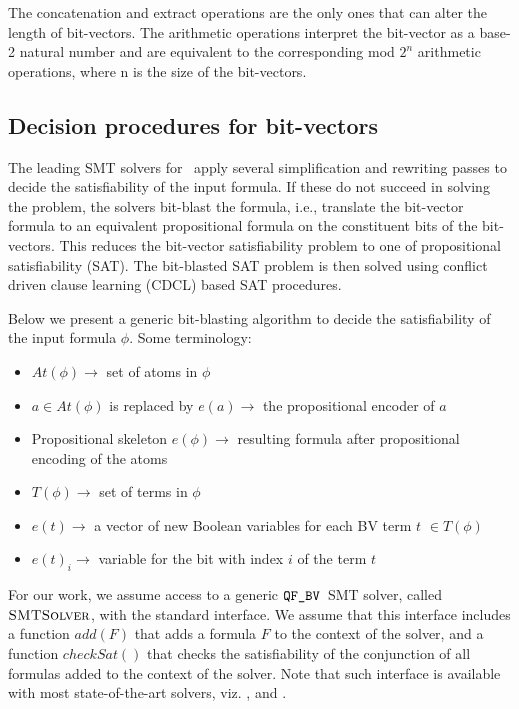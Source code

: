 The
concatenation and extract operations are the only ones that can alter the
length of bit-vectors. The arithmetic operations interpret the bit-vector as a base-2 natural number and are
equivalent to the corresponding mod $2^n$ arithmetic operations, where n is the size of the bit-vectors.

\subsection{Decision procedures for bit-vectors}

The leading SMT solvers for \qfbv~apply several simplification and
rewriting passes to decide the satisfiability of the input formula.
If these do not succeed in solving the problem, the solvers bit-blast
the formula, i.e., translate the bit-vector formula to an
equivalent propositional formula on the constituent bits of the
bit-vectors.  This reduces the bit-vector satisfiability problem to
one of propositional satisfiability (SAT).
%
The bit-blasted SAT problem is then solved using conflict driven clause
learning (CDCL)\cite{cdcl1,cdcl2} based SAT procedures.
%

Below we present a generic bit-blasting algorithm to decide the satisfiability of the input formula $\phi$. Some terminology:

\begin{itemize}

\item $At(\phi)\rightarrow$ set of atoms in $\phi$ 
\item $a \in At(\phi)$ is replaced by $e(a) \rightarrow$ the propositional encoder of $a$ 
\item Propositional skeleton $e(\phi) \rightarrow$ resulting formula after propositional encoding of the atoms 
\item $T(\phi)\rightarrow$ set of terms in $\phi$ 
\item $e(t)\rightarrow$ a vector of new Boolean variables for each BV term $t$ $\in T(\phi)$ 
\item $e(t)_i\rightarrow$ variable for the bit with index $i$ of the term $t$ 
\end{itemize}



For our work, we assume access to a generic $\texttt{QF\_BV}$~SMT solver, called
$\textsc{SMTSolver}$, with the standard interface.
%
We assume that this interface includes a function $add(F)$ that adds a
formula $F$ to the context of the solver, and a function $checkSat()$
that checks the satisfiability of the conjunction of all formulas
added to the context of the solver.  Note that such interface is
available with most state-of-the-art solvers, viz. {\boolector},
{\cvcfour} and {\zthree}.

